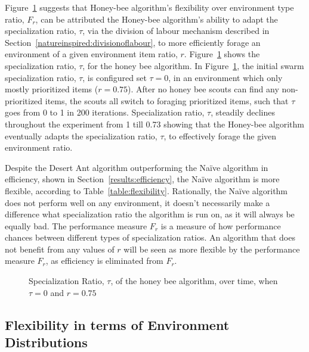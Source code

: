 Figure~\ref{fig:specializationratioovertime} suggests that Honey-bee algorithm's flexibility over environment type ratio, $F_r$, can be attributed the Honey-bee algorithm's ability to adapt the specialization ratio, $\tau$, via the division of labour mechanism described in Section~\ref{natureinspired:divisionoflabour}, to more efficiently forage an environment of a given environment item ratio, $r$. Figure~\ref{fig:specializationratioovertime} shows the specialization ratio, $\tau$, for the honey bee algorithm. In Figure~\ref{fig:specializationratioovertime}, the initial swarm specialization ratio, $\tau$, is configured set $\tau=0$, in an environment which only mostly prioritized items ($r=0.75$). After no honey bee scouts can find any non-prioritized items, the scouts all switch to foraging prioritized items, such that $\tau$ goes from 0 to 1 in 200 iterations. Specialization ratio, $\tau$, steadily declines throughout the experiment from 1 till 0.73 showing that the Honey-bee algorithm eventually adapts the specialization ratio, $\tau$, to effectively forage the given environment ratio. 

Despite the Desert Ant algorithm outperforming the Na\"ive algorithm in efficiency, shown in Section~\ref{results:efficiency}, the Na\"ive algorithm is more flexible, according to Table~\ref{table:flexibility}. Rationally, the Na\"ive algorithm does not perform well on any environment, it doesn't necessarily make a difference what specialization ratio the algorithm is run on, as it will always be equally bad. The performance measure $F_r$ is a measure of how performance chances between different types of specialization ratios. An algorithm that does not benefit from any values of $r$ will be seen as more flexible by the performance measure $F_r$, as efficiency is eliminated from $F_r$.

\begin{figure}[!htb]
\centering
\resizebox{\textwidth}{!}{}
\caption{Specialization Ratio, $\tau$, of the honey bee algorithm, over time, when $\tau=0$ and $r=0.75$}
\label{fig:specializationratioovertime}
\end{figure}


\subsection{Flexibility in terms of Environment Distributions}
\label{results:flexibility:environmentdistribution}

